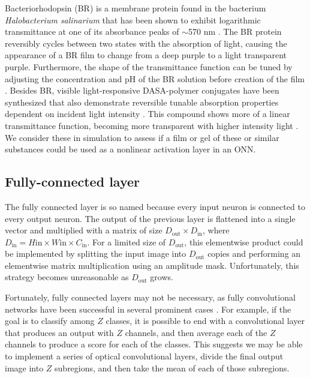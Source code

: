 Bacteriorhodopsin (BR) is a membrane protein found in the bacterium \textit{Halobacterium salinarium} that has been shown to exhibit logarithmic transmittance at one of its absorbance peaks of $\sim$570 nm \cite{downie1995nonlinear}. The BR protein reversibly cycles between two states with the absorption of light, causing the appearance of a BR film to change from a deep purple to a light transparent purple. Furthermore, the shape of the transmittance function can be tuned by adjusting the concentration and pH of the BR solution before creation of the film \cite{thoma1991bacteriorhodopsin}. Besides BR, visible light-responsive DASA-polymer conjugates have been synthesized that also demonstrate reversible tunable absorption properties dependent on incident light intensity \cite{ulrich2017visible}. This compound shows more of a linear transmittance function, becoming more transparent with higher intensity light \cite{dolinski2017versatile}. We consider these in simulation to assess if a film or gel of these or similar substances could be used as a nonlinear activation layer in an ONN. 

\subsection*{Fully-connected layer}
The fully connected layer is so named because every input neuron is connected to every output neuron.
The output of the previous layer is flattened into a single vector and multiplied with a matrix of size $D_\text{out} \times D_\text{in}$, where $D_\text{in} = H\text{in} \times W\text{in} \times C_\text{in}$. For a limited size of $D_\text{out}$, this elementwise product could be implemented by splitting the input image into $D_\text{out}$ copies and performing an elementwise matrix multiplication using an amplitude mask. Unfortunately, this strategy becomes unreasonable as $D_\text{out}$ grows. 

Fortunately, fully connected layers may not be necessary, as fully convolutional networks have been successful in several prominent cases \cite{lin2013network,iandola2016squeezenet}. For example, if the goal is to classify among $Z$ classes, it is possible to end with a convolutional layer that produces an output with $Z$ channels, and then average each of the $Z$ channels to produce a score for each of the classes. This suggests we may be able to implement a series of optical convolutional layers, divide the final output image into $Z$ subregions, and then take the mean of each of those subregions.

